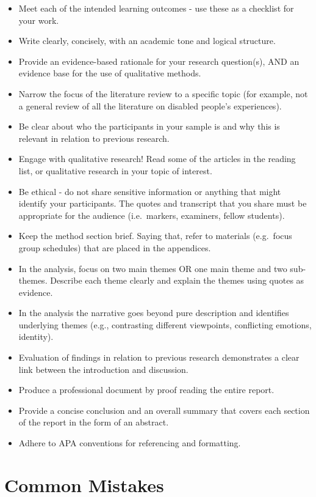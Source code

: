 \documentclass[
  english,
  letterpaper,
  DIV=11,
  numbers=noendperiod]{scrreprt}
\begin{document}
\begin{itemize}
\item
  Meet each of the intended learning outcomes - use these as a checklist
  for your work.
\item
  Write clearly, concisely, with an academic tone and logical structure.
\item
  Provide an evidence-based rationale for your research question(s), AND
  an evidence base for the use of qualitative methods.
\item
  Narrow the focus of the literature review to a specific topic (for
  example, not a general review of all the literature on disabled
  people's experiences).
\item
  Be clear about who the participants in your sample is and why this is
  relevant in relation to previous research.
\item
  Engage with qualitative research! Read some of the articles in the
  reading list, or qualitative research in your topic of interest.
\item
  Be ethical - do not share sensitive information or anything that might
  identify your participants. The quotes and transcript that you share
  must be appropriate for the audience (i.e.~markers, examiners, fellow
  students).
\item
  Keep the method section brief. Saying that, refer to materials
  (e.g.~focus group schedules) that are placed in the appendices.
\item
  In the analysis, focus on two main themes OR one main theme and two
  sub-themes. Describe each theme clearly and explain the themes using
  quotes as evidence.
\item
  In the analysis the narrative goes beyond pure description and
  identifies underlying themes (e.g., contrasting different viewpoints,
  conflicting emotions, identity).
\item
  Evaluation of findings in relation to previous research demonstrates a
  clear link between the introduction and discussion.
\item
  Produce a professional document by proof reading the entire report.
\item
  Provide a concise conclusion and an overall summary that covers each
  section of the report in the form of an abstract.
\item
  Adhere to APA conventions for referencing and formatting.
\end{itemize}

\section{Common Mistakes}\label{common-mistakes-3}
\end{document}
